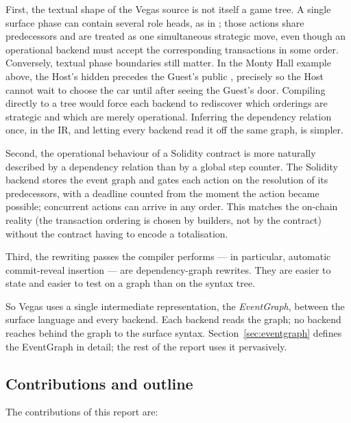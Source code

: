 First, the textual shape of the Vegas source is not itself a
game tree.  A single surface phase can contain several role heads,
as in ; those actions share
predecessors and are treated as one simultaneous strategic move,
even though an operational backend must accept the corresponding
transactions in some order.  Conversely, textual phase boundaries
still matter.  In the Monty Hall example above, the Host's hidden
 precedes the Guest's public , precisely so
the Host cannot wait to choose the car until after seeing the
Guest's door.  Compiling directly to a tree would force each
backend to rediscover which orderings are strategic and which are
merely operational.  Inferring the dependency relation once, in
the IR, and letting every backend read it off the same graph, is
simpler.

Second, the operational behaviour of a Solidity contract is more
naturally described by a dependency relation than by a global step
counter.  The Solidity backend stores the event graph and gates
each action on the resolution of its predecessors, with a deadline
counted from the moment the action became possible; concurrent
actions can arrive in any order.  This matches the on-chain reality (the
transaction ordering is chosen by builders, not by the contract)
without the contract having to encode a totalisation.

Third, the rewriting passes the compiler performs --- in particular,
automatic commit-reveal insertion --- are dependency-graph rewrites.
They are easier to state and easier to test on a graph than on the
syntax tree.

So Vegas uses a single intermediate representation, the
\emph{EventGraph}, between the surface language and every backend.
Each backend reads the graph; no backend reaches behind the graph
to the surface syntax.  Section~\ref{sec:eventgraph} defines the
EventGraph in detail; the rest of the report uses it pervasively.

\subsection{Contributions and outline}
\label{sec:intro:contributions}

The contributions of this report are:

